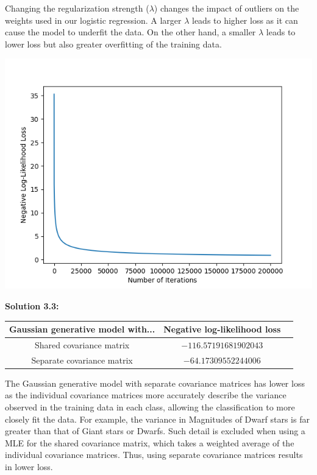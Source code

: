 \documentclass[submit]{harvardml}
\begin{document}
Changing the regularization strength ($\lambda$) changes the impact of outliers on the weights used in our logistic regression. A larger $\lambda$ leads to higher loss as it can cause the model to underfit the data. On the other hand, a smaller $\lambda$ leads to lower loss but also greater overfitting of the training data.
\begin{center}
    \includegraphics[scale=0.7]{HW2/logistic_regression_loss.png}
\end{center}

\noindent\textbf{Solution 3.3:}\\
\begin{center}
\begin{tabular}{ |c|c|c| } 
 \hline
 Gaussian generative model with... & Negative log-likelihood loss \\ 
 \hline\hline
 Shared covariance matrix & $-116.57191681902043$ \\
 \hline
 Separate covariance matrix & $-64.17309552244006$ \\ 
 \hline
\end{tabular}
\end{center}

The Gaussian generative model with separate covariance matrices has lower loss as the individual covariance matrices more accurately describe the variance observed in the training data in each class, allowing the classification to more closely fit the data. For example, the variance in Magnitudes of Dwarf stars is far greater than that of Giant stars or Dwarfs. Such detail is excluded when using a MLE for the shared covariance matrix, which takes a weighted average of the individual covariance matrices. Thus, using separate covariance matrices results in lower loss.
\end{document}

